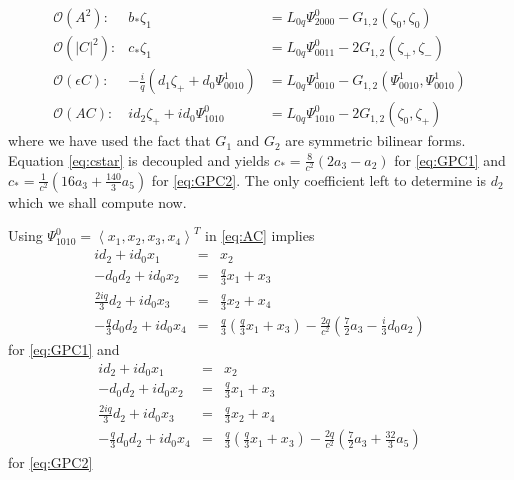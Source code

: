 \begin{subequations}
\begin{eqnarray}
\mathcal{O}(A^2): &		b_* \zeta_1 &= L_{0q} \Psi_{2000}^0 - G_{1,2}(\zeta_0,\zeta_0) \\
\mathcal{O}(\left|C\right|^2):&	c_* \zeta_1 &= L_{0q} \Psi_{0011}^0 -2 G_{1,2}(\zeta_+,\zeta_-) \label{eq:cstar} \\
\mathcal{O}(\epsilon C): &-\frac{i}{q} \left(d_1 \zeta_+ +  d_0 \Psi_{0010}^1\right) &= L_{0q} \Psi_{0010}^1 - G_{1,2}(\Psi_{0010}^1,\Psi_{0010}^1) \\
\mathcal{O}(A C): 	&i d_2 \zeta_+ + i d_0 \Psi_{1010}^0 &= L_{0q} \Psi_{1010}^0 - 2 G_{1,2}(\zeta_0,\zeta_+)  \label{eq:AC}
\end{eqnarray}
\end{subequations}
where we have used the fact that $G_1$ and $G_2$ are symmetric bilinear forms. Equation \eqref{eq:cstar} is decoupled and yields 
$ c_* = \frac{8}{c^2}\left( 2 a_3 - a_2 \right)$ for \eqref{eq:GPC1} and 
$ c_* = \frac{1}{c^2}\left( 16 a_3 + \frac{140}{3} a_5 \right)$ for \eqref{eq:GPC2}. The only coefficient left to determine is $d_2$ which we shall compute now. 

Using $\Psi_{1010}^0 = \left<x_1,x_2,x_3,x_4\right>^T$ in \eqref{eq:AC} implies 
\begin{subequations}
\begin{eqnarray}
i d_2 + i d_0 x_1 &=& x_2 \label{eq:one} \\
- d_0 d_2 + i d_0 x_2 &=& \frac{q}{3} x_1 + x_3 \label{eq:two} \\
\frac{2 i q}{3} d_2 + i d_0 x_3 &=& \frac{q}{3} x_2 + x_4  \label{eq:three} \\
- \frac{q}{3} d_0 d_2 + i d_0 x_4 &=& \frac{q}{3}\left(\frac{q}{3} x_1 + x_3 \right) - \frac{ 2 q}{c^2}\left(\frac{7}{2} a_3 - \frac{i}{3} d_0 a_2\right) \label{eq:four}
\end{eqnarray}
\end{subequations}
for \eqref{eq:GPC1} and
\begin{subequations}
\begin{eqnarray}
i d_2 + i d_0 x_1 &=& x_2 \label{eq:one} \\
- d_0 d_2 + i d_0 x_2 &=& \frac{q}{3} x_1 + x_3 \label{eq:two} \\
\frac{2 i q}{3} d_2 + i d_0 x_3 &=& \frac{q}{3} x_2 + x_4  \label{eq:three} \\
- \frac{q}{3} d_0 d_2 + i d_0 x_4 &=& \frac{q}{3}\left(\frac{q}{3} x_1 + x_3 \right) - \frac{2 q}{c^2}\left( \frac{7}{2} a_3 + \frac{32}{3} a_5\right) \label{eq:four}
\end{eqnarray}
\end{subequations}
for \eqref{eq:GPC2}

